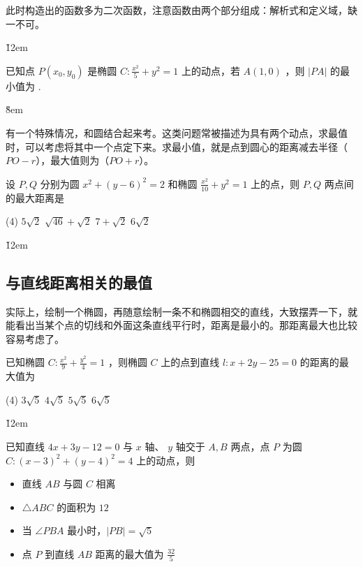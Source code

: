 \begin{tips}
    此时构造出的函数多为二次函数，注意函数由两个部分组成：解析式和定义域，缺一不可。
\end{tips}

\v{12em}

\begin{example}
    已知点 $P\left(x_0, y_0\right)$ 是椭圆 $C: \frac{x^2}{5}+y^2=1$ 上的动点，若 $A(1,0)$ ，则 $|P A|$ 的最小值为 \underline{\qquad}.
\end{example}

\v{8em}

\begin{theorem}[定一动一]
    有一个特殊情况，和圆结合起来考。这类问题常被描述为具有两个动点，求最值时，可以考虑将其中一个点定下来。求最小值，就是点到圆心的距离减去半径（$PO-r$），最大值则为（$PO+r$）。
\end{theorem}

\begin{example}
    设 $P, Q$ 分别为圆 $x^{2}+(y-6)^{2}=2$ 和椭圆 $\frac{x^{2}}{10}+y^{2}=1$ 上的点，则 $P, Q$ 两点间的最大距离是
    \begin{tasks}(4)
        \task $5 \sqrt{2}$
        \task $\sqrt{46}+\sqrt{2}$
        \task $7+\sqrt{2}$
        \task $6 \sqrt{2}$
    \end{tasks}
\end{example}

\v{12em}

\subsection{与直线距离相关的最值}

\begin{tips}
    实际上，绘制一个椭圆，再随意绘制一条不和椭圆相交的直线，大致摆弄一下，就能看出当某个点的切线和外面这条直线平行时，距离是最小的。那距离最大也比较容易考虑了。
\end{tips}

\begin{example}
    已知椭圆 $C: \frac{x^{2}}{9}+\frac{y^{2}}{4}=1$ ，则椭圆 $C$ 上的点到直线 $l: x+2 y-25=0$ 的距离的最大值为
    \begin{tasks}(4)
        \task $3 \sqrt{5}$
        \task $4 \sqrt{5}$
        \task $5 \sqrt{5}$
        \task $6 \sqrt{5}$
    \end{tasks}
\end{example}

\v{12em}

\begin{problem}
已知直线 $4x+3y-12=0$ 与 $x$ 轴、 $y$ 轴交于 $A, B$ 两点，点 $P$ 为圆 $C:(x-3)^{2}+(y-4)^{2}=4$ 上的动点，则
\begin{itemize}
    \item 直线 $AB$ 与圆 $C$ 相离
    \item $\triangle ABC$ 的面积为 $12$
    \item 当 $\angle PBA$ 最小时，$|PB|=\sqrt{5}$
    \item 点 $P$ 到直线 $AB$ 距离的最大值为 $\frac{32}{5}$
\end{itemize}
\end{problem}

